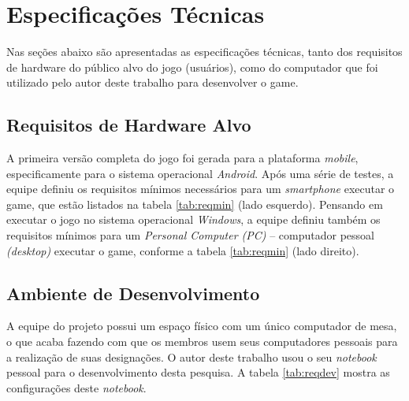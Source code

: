 \begin{itemize}
\end{itemize}

\section{Especificações Técnicas}
\label{sec:especificacoes}

Nas seções abaixo são apresentadas as especificações técnicas, tanto dos requisitos de hardware do público alvo do jogo (usuários), como do computador que foi utilizado pelo autor deste trabalho para desenvolver o game.

\newpage

\subsection{Requisitos de Hardware Alvo}

A primeira versão completa do jogo foi gerada para a plataforma \textit{mobile}, especificamente para o sistema operacional \textit{Android}. Após uma série de testes, a equipe definiu os requisitos mínimos necessários para um \textit{smartphone} executar o game, que estão listados na tabela \ref{tab:reqmin} (lado esquerdo). Pensando em executar o jogo no sistema operacional \textit{Windows}, a equipe definiu também os requisitos mínimos para um \textit{Personal Computer (PC)} -- computador pessoal \textit{(desktop)} executar o game, conforme a tabela \ref{tab:reqmin} (lado direito).



\subsection{Ambiente de Desenvolvimento}

A equipe do projeto possui um espaço físico com um único computador de mesa, o que acaba fazendo com que os membros usem seus computadores pessoais para a realização de suas designações. O autor deste trabalho usou o seu \textit{notebook} pessoal para o desenvolvimento desta pesquisa. A tabela \ref{tab:reqdev} mostra as configurações deste \textit{notebook}.


